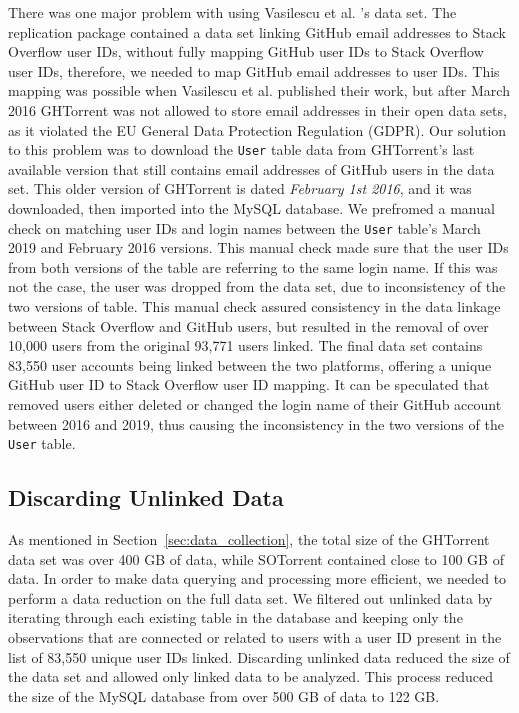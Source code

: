         There was one major problem with using Vasilescu et al. \cite{vasilescu2013stackoverflow}'s data set. The replication package contained a data set linking GitHub email addresses to Stack Overflow user IDs, without fully mapping GitHub user IDs to Stack Overflow user IDs, therefore, we needed to map GitHub email addresses to user IDs. This mapping was possible when Vasilescu et al. \cite{vasilescu2013stackoverflow} published their work, but after March 2016 GHTorrent was not allowed to store email addresses in their open data sets, as it violated the EU General Data Protection Regulation (GDPR). Our solution to this problem was to download the \texttt{User} table data from GHTorrent's last available version that still contains email addresses of GitHub users in the data set. This older version of GHTorrent is dated \textit{February 1st 2016}, and it was downloaded, then imported into the MySQL database. We prefromed a manual check on matching user IDs and login names between the \texttt{User} table's March 2019 and February 2016 versions. This manual check made sure that the user IDs from both versions of the table are referring to the same login name. If this was not the case, the user was dropped from the data set, due to inconsistency of the two versions of table. This manual check assured consistency in the data linkage between Stack Overflow and GitHub users, but resulted in the removal of over 10,000 users from the original 93,771 users linked. The final data set contains 83,550 user accounts being linked between the two platforms, offering a unique GitHub user ID to Stack Overflow user ID mapping. It can be speculated that removed users either deleted or changed the login name of their GitHub account between 2016 and 2019, thus causing the inconsistency in the two versions of the \texttt{User} table.
        
    \subsection{Discarding Unlinked Data}
    
       As mentioned in Section~\ref{sec:data_collection}, the total size of the GHTorrent data set was over 400 GB of data, while SOTorrent contained close to 100 GB of data. In order to make data querying and processing more efficient, we needed to perform a data reduction on the full data set. 
       We filtered out unlinked data by iterating through each existing table in the database and keeping only the observations that are connected or related to users with a user ID present in the list of 83,550 unique user IDs linked. Discarding unlinked data reduced the size of the data set and allowed only linked data to be analyzed. This process reduced the size of the MySQL database from over 500 GB of data to 122 GB.
        

